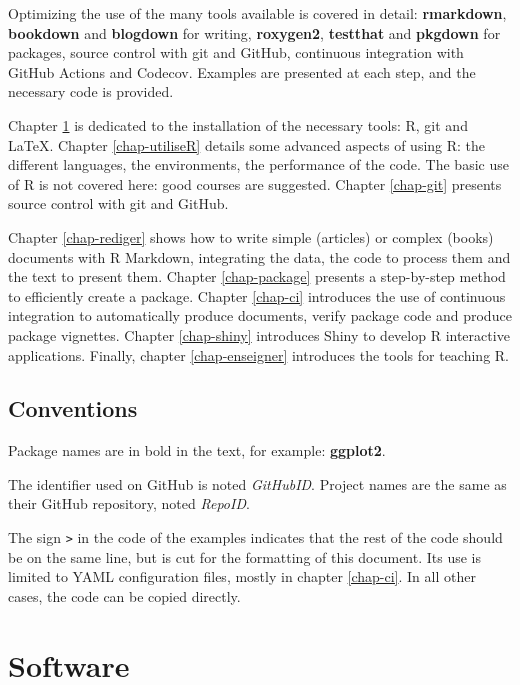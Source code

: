 \documentclass[
  12pt,
  american,
  a4paper,
  extrafontsizes,onecolumn,openright
  ]{memoir}
\newlength{\rf}
\begin{document}
Optimizing the use of the many tools available is covered in detail: \textbf{rmarkdown}, \textbf{bookdown} and \textbf{blogdown} for writing, \textbf{roxygen2}, \textbf{testthat} and \textbf{pkgdown} for packages, source control with git and GitHub, continuous integration with GitHub Actions and Codecov.
Examples are presented at each step, and the necessary code is provided.

Chapter \ref{chap-logiciels} is dedicated to the installation of the necessary tools: R, git and LaTeX.
Chapter \ref{chap-utiliseR} details some advanced aspects of using R: the different languages, the environments, the performance of the code.
The basic use of R is not covered here: good courses are suggested.
Chapter \ref{chap-git} presents source control with git and GitHub.

Chapter \ref{chap-rediger} shows how to write simple (articles) or complex (books) documents with R Markdown, integrating the data, the code to process them and the text to present them.
Chapter \ref{chap-package} presents a step-by-step method to efficiently create a package.
Chapter \ref{chap-ci} introduces the use of continuous integration to automatically produce documents, verify package code and produce package vignettes.
Chapter \ref{chap-shiny} introduces Shiny to develop R interactive applications.
Finally, chapter \ref{chap-enseigner} introduces the tools for teaching R.

\section*{Conventions}\label{conventions}

Package names are in bold in the text, for example: \textbf{ggplot2}.

The identifier used on GitHub is noted \emph{GitHubID}.
Project names are the same as their GitHub repository, noted \emph{RepoID}.

The sign \texttt{\textbar{}\textgreater{}} in the code of the examples indicates that the rest of the code should be on the same line, but is cut for the formatting of this document.
Its use is limited to YAML configuration files, mostly in chapter \ref{chap-ci}.
In all other cases, the code can be copied directly.

\mainmatter

\chapter{Software}\label{chap-logiciels}
\end{document}
